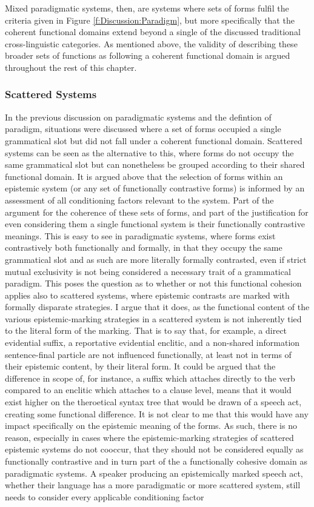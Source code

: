 Mixed paradigmatic systems, then, are systems where sets of forms fulfil the criteria given in Figure \ref{f:Discussion:Paradigm}, but more specifically that the coherent functional domains extend beyond a single of the discussed traditional cross-linguistic categories. As mentioned above, the validity of describing these broader sets of functions as following a coherent functional domain is argued throughout the rest of this chapter.

\subsubsection{Scattered Systems}\label{sss:Discussion:Scattered}
In the previous discussion on paradigmatic systems and the defintion of paradigm, situations were discussed where a set of forms occupied a single grammatical slot but did not fall under a coherent functional domain. Scattered systems can be seen as the alternative to this, where forms do not occupy the same grammatical slot but can nonetheless be grouped according to their shared functional domain. It is argued above that the selection of forms within an epistemic system (or any set of functionally contrastive forms) is informed by an assessment of all conditioning factors relevant to the system. Part of the argument for the coherence of these sets of forms, and part of the justification for even considering them a single functional system is their functionally contrastive meanings. This is easy to see in paradigmatic systems, where forms exist contrastively both functionally and formally, in that they occupy the same grammatical slot and as such are more literally formally contrasted, even if strict mutual exclusivity is not being considered a necessary trait of a grammatical paradigm. This poses the question as to whether or not this functional cohesion applies also to scattered systems, where epistemic contrasts are marked with formally disparate strategies. I argue that it does, as the functional content of the various epistemic-marking strategies in a scattered system is not inherently tied to the literal form of the marking. That is to say that, for example, a direct evidential suffix, a reportative evidential enclitic, and a non-shared information sentence-final particle are not influenced functionally, at least not in terms of their epistemic content, by their literal form. It could be argued that the difference in scope of, for instance, a suffix which attaches directly to the verb compared to an enclitic which attaches to a clause level, means that it would exist higher on the theroetical syntax tree that would be drawn of a speech act, creating some functional difference. It is not clear to me that this would have any impact specifically on the epistemic meaning of the forms. As such, there is no reason, especially in cases where the epistemic-marking strategies of scattered epistemic systems do not cooccur, that they should not be considered equally as functionally contrastive and in turn part of the a functionally cohesive domain as paradigmatic systems. A speaker producing an epistemically marked speech act, whether their language has a more paradigmatic or more scattered system, still needs to consider every applicable conditioning factor 